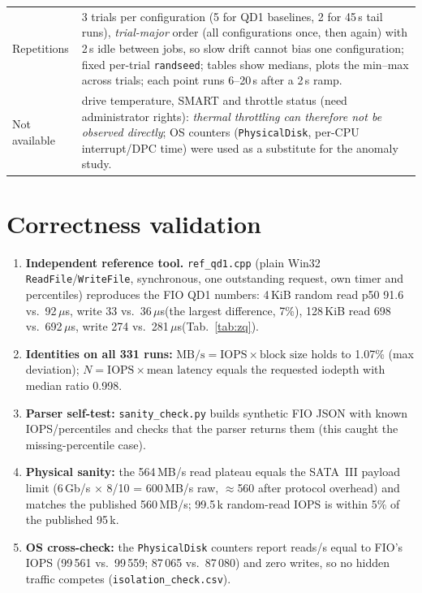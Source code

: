 ﻿\documentclass[10.5pt]{article}
\newcommand{\us}{\,$\mu$s}
\begin{document}
\begin{center}
\begin{tabular}{p{3.1cm}p{12.7cm}}
Repetitions & 3 trials per configuration (5 for QD1 baselines, 2 for 45\,s tail runs), \emph{trial-major} order (all configurations once, then again) with 2\,s idle between jobs, so slow drift cannot bias one configuration; fixed per-trial \texttt{randseed}; tables show medians, plots the min--max across trials; each point runs 6--20\,s after a 2\,s ramp. \\
Not available & drive temperature, SMART and throttle status (need administrator rights): \emph{thermal throttling can therefore not be observed directly}; OS counters (\texttt{PhysicalDisk}, per-CPU interrupt/DPC time) were used as a substitute for the anomaly study. \\
\bottomrule
\end{tabular}
\end{center}

\section{Correctness validation}
\begin{enumerate}
  \item \textbf{Independent reference tool.} \texttt{ref\_qd1.cpp} (plain Win32 \texttt{ReadFile}/\texttt{WriteFile}, synchronous, one outstanding request, own timer and percentiles) reproduces the FIO QD1 numbers: 4\,KiB random read p50 91.6 vs.\ 92\us, write 33 vs.\ 36\us (the largest difference, 7\%), 128\,KiB read 698 vs.\ 692\us, write 274 vs.\ 281\us (Tab.~\ref{tab:zq}).
  \item \textbf{Identities on all 331 runs:} $\text{MB/s}=\text{IOPS}\times\text{block size}$ holds to 1.07\% (max deviation); $N=\text{IOPS}\times\text{mean latency}$ equals the requested iodepth with median ratio 0.998.
  \item \textbf{Parser self-test:} \texttt{sanity\_check.py} builds synthetic FIO JSON with known IOPS/percentiles and checks that the parser returns them (this caught the missing-percentile case).
  \item \textbf{Physical sanity:} the 564\,MB/s read plateau equals the SATA~III payload limit (6\,Gb/s $\times$ 8/10 = 600\,MB/s raw, $\approx$560 after protocol overhead) and matches the published 560\,MB/s; 99.5\,k random-read IOPS is within 5\% of the published 95\,k.
  \item \textbf{OS cross-check:} the \texttt{PhysicalDisk} counters report reads/s equal to FIO's IOPS (99\,561 vs.\ 99\,559; 87\,065 vs.\ 87\,080) and zero writes, so no hidden traffic competes (\texttt{isolation\_check.csv}).
\end{enumerate}
\end{document}
